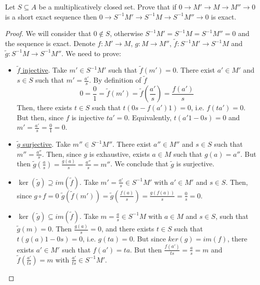 \begin{problem}
    Let $S \subseteq A$ be a multiplicatively closed set.
    Prove that if $0 \rightarrow M' \rightarrow M \rightarrow M'' \rightarrow 0$ is a short exact sequence then
    $0 \rightarrow S^{-1}M' \rightarrow S^{-1}M \rightarrow S^{-1}M'' \rightarrow 0$ is exact.
    \begin{sol}
        \begin{proof}
            We will consider that $0 \notin S$, otherwise $S^{-1}M' = S^{-1}M = S^{-1}M'' = 0$ and the sequence is exact.
            Denote $f: M' \rightarrow M$, $g: M \rightarrow M''$, $\tilde{f}: S^{-1}M' \rightarrow S^{-1}M$ and $\tilde{g}: S^{-1}M \rightarrow S^{-1}M''$.
            We need to prove:
            \begin{itemize}
                \item \underline{$\tilde{f}$ injective}.
                Take $m' \in S^{-1}M'$ such that $\tilde{f}(m') = 0$.
                There exist $a' \in M'$ and $s \in S$ such that $m' = \frac{a'}{s}$.
                By definition of $\tilde{f}$
                \[
                    0 = \frac{0}{1} = \tilde{f}(m') = \tilde{f}(\frac{a'}{s}) = \frac{f(a')}{s}
                \]
                Then, there exists $t \in S$ such that $t (0 s - f(a') 1) = 0$, i.e. $f(t a') = 0$.
                But then, since $f$ is injective $t a' = 0$.
                Equivalently, $t (a'1 - 0 s) = 0$ and $m' = \frac{a'}{s} = \frac{0}{1} = 0$.
                \item \underline{$\tilde{g}$ surjective}.
                Take $m'' \in S^{-1}M''$.
                There exist $a'' \in M''$ and $s \in S$ such that $m'' = \frac{a''}{s}$.
                Then, since $g$ is exhaustive, exists $a \in M$ such that $g(a) = a''$.
                But then $\tilde{g}(\frac{a}{s}) = \frac{g(a)}{s} = \frac{a''}{s} = m''$.
                We conclude that $\tilde{g}$ is surjective.
                \item \underline{$\ker(\tilde{g}) \supseteq im(\tilde{f})$}.
                Take $m' = \frac{a'}{s} \in S^{-1}M'$ with $a' \in M'$ and $s \in S$.
                Then, since $g \circ f = 0$ $\tilde{g}(\tilde{f}(m')) = \tilde{g}(\frac{f(a)}{s}) = \frac{g(f(a))}{s} = \frac{0}{s} = 0$.
                \item \underline{$\ker(\tilde{g}) \subseteq im(\tilde{f})$}.
                Take $m = \frac{a}{s} \in S^{-1}M$ with $a \in M$ and $s \in S$, such that $\tilde{g}(m) = 0$.
                Then $\frac{g(a)}{s} = 0$, and there exists $t \in S$ such that $t(g(a) 1 - 0 s) = 0$, i.e. $g(ta) = 0$.
                But since $ker(g) = im(f)$, there exists $a' \in M'$ such that $f(a') = ta$.
                But then $\frac{f(a')}{ts} = \frac{a}{s} = m$ and $\tilde{f}(\frac{a'}{ts}) = m$ with $\frac{a'}{ts} \in S^{-1}M'$.
            \end{itemize}
        \end{proof}
    \end{sol}
\end{problem}